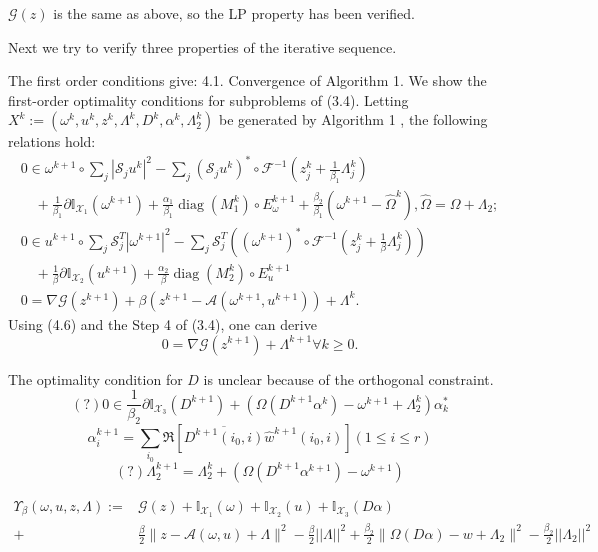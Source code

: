 \documentclass{article}
\numberwithin{equation}{section}
\begin{document}
$\mathcal{G}(z)$ is the same as above, so the LP property has been verified.

Next we try to verify three properties of the iterative sequence.

The first order conditions give:
4.1. Convergence of Algorithm 1. We show the first-order optimality conditions for subproblems of (3.4). Letting $X^{k}:=\left(\omega^{k}, u^{k}, z^{k}, \Lambda^{k},D^k,\alpha^k,\Lambda_2^{k}\right)$ be generated by Algorithm 1 , the following relations hold:
$$
\begin{gathered}
0 \in \omega^{k+1} \circ \sum_{j}\left|\mathcal{S}_{j} u^{k}\right|^{2}-\sum_{j}\left(\mathcal{S}_{j} u^{k}\right)^{*} \circ \mathcal{F}^{-1}\left(z_{j}^{k}+\frac{1}{\beta_1} \Lambda_{j}^{k}\right) \\
\quad+\frac{1}{\beta_1} \partial \mathbb{I}_{\mathcal{X}_{1}}\left(\omega^{k+1}\right)+\frac{\alpha_{1}}{\beta_1} \operatorname{diag}\left(M_{1}^{k}\right) \circ E_{\omega}^{k+1} 
+ \frac{\beta_2}{\beta_1}(\omega^{k+1} - \hat{\Omega}^{k}),\hat{\Omega}=\Omega+ \Lambda_2 ; \\
0 \in u^{k+1} \circ \sum_{j} \mathcal{S}_{j}^{T}\left|\omega^{k+1}\right|^{2}-\sum_{j} \mathcal{S}_{j}^{T}\left(\left(\omega^{k+1}\right)^{*} \circ \mathcal{F}^{-1}\left(z_{j}^{k}+\frac{1}{\beta} \Lambda_{j}^{k}\right)\right) \\
\quad+\frac{1}{\beta} \partial \mathbb{I}_{\mathcal{X}_{2}}\left(u^{k+1}\right)+\frac{\alpha_{2}}{\beta} \operatorname{diag}\left(M_{2}^{k}\right) \circ E_{u}^{k+1} \\
0=\nabla \mathcal{G}\left(z^{k+1}\right)+\beta\left(z^{k+1}-\mathcal{A}\left(\omega^{k+1}, u^{k+1}\right)\right)+\Lambda^{k} .
\end{gathered}
$$
Using (4.6) and the Step 4 of (3.4), one can derive
$$
0=\nabla \mathcal{G}\left(z^{k+1}\right)+\Lambda^{k+1} \forall k \geq 0 .
$$

The optimality condition for $D$ is unclear because of the orthogonal constraint. 
$$
(?)0 \in \frac{1}{\beta_2}\partial\mathbb{I}_{\mathcal{X}_{3}}\left(D^{k+1}\right) + (\Omega(D^{k+1}\alpha^k) - \omega^{k+1} + \Lambda_2^{k})\alpha_k^*
$$
$$
\alpha_i^{k+1} =  \sum_{i_0} \Re[ \overline{D^{k+1}(i_0,i)} \hat {w}^{k+1}(i_0,i) ]
(1\leq i \leq r)
$$
$$
(?)\Lambda_2^{k+1} = \Lambda_2^{k} + (\Omega(D^{k+1}\alpha^{k+1}) - \omega^{k+1})
$$





\begin{equation}
\begin{aligned}
\Upsilon_{\beta}(\omega, u, z, \Lambda):=&\mathcal{G}(z)+\mathbb{I}_{\mathcal{X}_{1}}(\omega)+\mathbb{I}_{\mathcal{X}_{2}}(u)+ \mathbb{I}_{\mathcal{X}_{3}}(D\alpha)  \\
+&\frac{\beta}{2}\|z-\mathcal{A}(\omega, u) + \Lambda \|^{2} - \frac{\beta}{2}||\Lambda||^2 +\frac{\beta_2}{2}\| \Omega(D\alpha) - w + \Lambda_2\|^{2} - \frac{\beta_2}{2}||\Lambda_2||^2 \\
\end{aligned}
\end{equation} 
\end{document}
